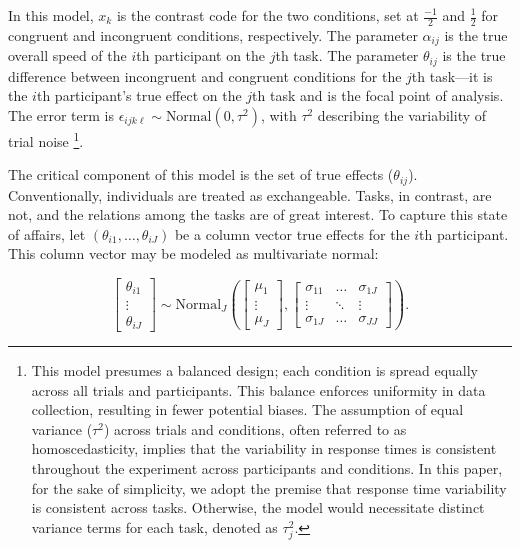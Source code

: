 \documentclass[man, 12pt]{apa7} %
\begin{document}
In this model, $x_k$ is the contrast code for the two conditions, set at $\frac{-1}{2}$ and $\frac{1}{2}$ for congruent and incongruent conditions, respectively. The parameter $\alpha_{ij}$ is the true overall speed of the $i$th participant on the $j$th task. The parameter $\theta_{ij}$ is the true difference between incongruent and congruent conditions for the $j$th task---it is the $i$th participant's true effect on the $j$th task and is the focal point of analysis.  The error term is $\epsilon_{ijk\ell} \sim \mbox{Normal}(0,\tau^2)$, with $\tau^2$ describing the variability of trial noise \footnote{This model presumes a balanced design; each condition is spread equally across all trials and participants. This balance enforces uniformity in data collection, resulting in fewer potential biases. The assumption of equal variance ($\tau^2$) across trials and conditions, often referred to as homoscedasticity, implies that the variability in response times is consistent throughout the experiment across participants and conditions. In this paper, for the sake of simplicity, we adopt the premise that response time variability is consistent across tasks. Otherwise, the model would necessitate distinct variance terms for each task, denoted as $\tau_j^2$.}. 


The critical component of this model is the set of true effects ($\theta_{ij}$). Conventionally, individuals are treated as exchangeable. Tasks, in contrast, are not, and the relations among the tasks are of great interest. To capture this state of affairs, let $(\theta_{i1},\ldots,\theta_{iJ})$ be a column vector true effects for the $i$th participant.  This column vector may be modeled as multivariate normal:

\begin{equation} \label{eq:true_effect_vec}
\begin{bmatrix}
\theta_{i1}\\ \vdots\\ \theta_{iJ}
\end{bmatrix} \sim \mbox{Normal}_J\left(
\begin{bmatrix}
\mu_1\\ \vdots\\ \mu_J
\end{bmatrix},
\begin{bmatrix}
\sigma_{11}&\ldots&\sigma_{1J}\\
\vdots &\ddots&\vdots\\
\sigma_{1J}&\ldots&\sigma_{JJ}
\end{bmatrix}
\right).
\end{equation}
\end{document}
